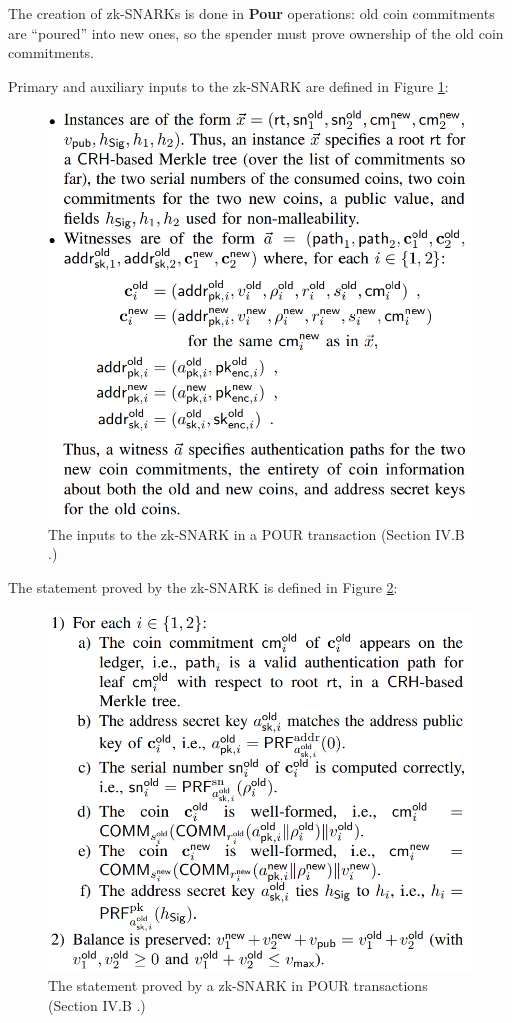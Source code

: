 \documentclass{article}
\begin{document}
The creation of zk-SNARKs is done in \textbf{Pour} operations:
old coin commitments are ``poured'' into new ones, so the spender must prove ownership of the old coin commitments.

Primary and auxiliary inputs to the zk-SNARK are defined in Figure \ref{fig:zerocash-inputs}:

\begin{figure}[H]
\centering
\includegraphics[width=.6\textwidth]{zerocash-inputs.png}
\caption{The inputs to the zk-SNARK in a POUR transaction (Section IV.B \cite{bensasson:zerocash}.)} \label{fig:zerocash-inputs}
\centering
\end{figure}

The statement proved by the zk-SNARK is defined in Figure \ref{fig:zerocash-pour}:

\begin{figure}[H]
\centering
\includegraphics[width=.6\textwidth]{zerocash-pour.png}
\caption{The statement proved by a zk-SNARK in POUR transactions (Section IV.B \cite{bensasson:zerocash}.)} \label{fig:zerocash-pour}
\centering
\end{figure}
\end{document}
